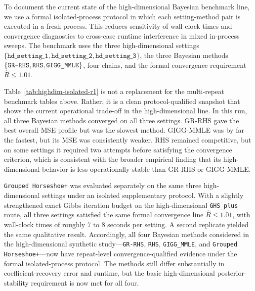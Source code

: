 \documentclass[11pt]{article}
\begin{document}
To document the current state of the high-dimensional Bayesian benchmark line,
we use a formal isolated-process protocol in which each setting-method pair is
executed in a fresh process. This reduces sensitivity of wall-clock times and
convergence diagnostics to cross-case runtime interference in mixed in-process
sweeps. The benchmark uses the three high-dimensional settings
\(\{\texttt{hd\_setting\_1},\texttt{hd\_setting\_2},\texttt{hd\_setting\_3}\}\),
the three Bayesian methods \(\{\texttt{GR\mbox{-}RHS}, \texttt{RHS},
\texttt{GIGG\_MMLE}\}\), four chains, and the formal convergence requirement
\(\hat R \le 1.01\).

Table~\ref{tab:highdim-isolated-r1} is not a replacement for the multi-repeat
benchmark tables above. Rather, it is a clean protocol-qualified snapshot that
shows the current operational trade-off in the high-dimensional line. In this
run, all three Bayesian methods converged on all three settings. GR-RHS gave
the best overall MSE profile but was the slowest method. GIGG-MMLE was by far
the fastest, but its MSE was consistently weaker. RHS remained competitive, but
on some settings it required two attempts before satisfying the convergence
criterion, which is consistent with the broader empirical finding that its
high-dimensional behavior is less operationally stable than GR-RHS or
GIGG-MMLE.

\texttt{Grouped Horseshoe+} was evaluated separately on the same three
high-dimensional settings under an isolated supplementary protocol. With a
slightly strengthened exact Gibbs iteration budget on the high-dimensional
\texttt{GHS\_plus} route, all three settings satisfied the same formal
convergence line \(\hat R \le 1.01\), with wall-clock times of roughly
\(7\) to \(8\) seconds per setting. A second replicate yielded the same
qualitative result. Accordingly, all four Bayesian methods considered in the
high-dimensional synthetic study---\texttt{GR-RHS}, \texttt{RHS},
\texttt{GIGG\_MMLE}, and \texttt{Grouped Horseshoe+}---now have repeat-level
convergence-qualified evidence under the formal isolated-process protocol. The
methods still differ substantially in coefficient-recovery error and runtime,
but the basic high-dimensional posterior-stability requirement is now met for
all four.
\end{document}
